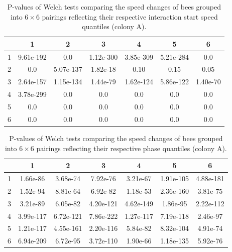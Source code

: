 \documentclass{article}
\begin{document}
\begin{table}[h!]
\centering
\def\tablename{Supplementary Table}
\caption{
P-values of Welch tests comparing the speed changes of bees grouped into $6 \times 6$ pairings reflecting their respective interaction start speed quantiles (colony A).
}
\begin{tabular}{|c|c|c|c|c|c|c|}
\hline
 & 1 & 2 & 3 & 4 & 5 & 6 \\ \hline
1 & 9.61e-192 & 0.0 & 1.12e-300 & 3.85e-309 & 5.21e-284 & 0.0 \\ \hline
2 & 0.0 & 5.07e-137 & 1.82e-18 & 0.10 & 0.15 & 0.05 \\ \hline
3 & 2.64e-157 & 1.15e-134 & 1.44e-79 & 1.62e-124 & 5.86e-122 & 1.40e-70 \\ \hline
4 & 3.78e-299 & 0.0 & 0.0 & 0.0 & 0.0 & 0.0 \\ \hline
5 & 0.0 & 0.0 & 0.0 & 0.0 & 0.0 & 0.0 \\ \hline
6 & 0.0 & 0.0 & 0.0 & 0.0 & 0.0 & 0.0 \\ \hline
\end{tabular}
\end{table}


\begin{table}[h!]
\centering
\def\tablename{Supplementary Table}
\caption{
P-values of Welch tests comparing the speed changes of bees grouped into $6 \times 6$ pairings reflecting their respective phase quantiles (colony A).
}
\begin{tabular}{|c|c|c|c|c|c|c|}
\hline
 & 1 & 2 & 3 & 4 & 5 & 6 \\ \hline
1 & 1.66e-86 & 3.68e-74 & 7.92e-76 & 3.21e-67 & 1.91e-105 & 4.88e-181 \\ \hline
2 & 1.52e-94 & 8.81e-64 & 6.92e-82 & 1.18e-53 & 2.36e-160 & 3.81e-75 \\ \hline
3 & 3.21e-89 & 6.05e-82 & 4.20e-121 & 4.62e-149 & 1.86e-95 & 2.22e-112 \\ \hline
4 & 3.99e-117 & 6.72e-121 & 7.86e-222 & 1.27e-117 & 7.19e-118 & 2.46e-97 \\ \hline
5 & 1.21e-117 & 4.55e-161 & 2.20e-116 & 5.84e-82 & 8.32e-104 & 4.91e-74 \\ \hline
6 & 6.94e-209 & 6.72e-95 & 3.72e-110 & 1.90e-66 & 1.18e-135 & 5.92e-76 \\ \hline
\end{tabular}
\end{table}
\end{document}
